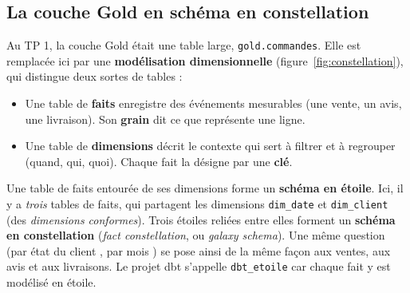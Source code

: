 \documentclass[11pt,a4paper]{article}
\newcommand{\cmd}[1]{\texttt{#1}}
\begin{document}
\subsection*{La couche Gold en schéma en constellation}

Au TP 1, la couche Gold était une table large, \cmd{gold.commandes}. Elle est remplacée ici par une
\textbf{modélisation dimensionnelle} (figure~\ref{fig:constellation}), qui distingue deux sortes de tables :

\begin{itemize}[leftmargin=*,itemsep=1pt]
\item Une table de \textbf{faits} enregistre des événements mesurables (une vente, un avis, une
  livraison). Son \textbf{grain} dit ce que représente une ligne.
\item Une table de \textbf{dimensions} décrit le contexte qui sert à filtrer et à regrouper (quand,
  qui, quoi). Chaque fait la désigne par une \textbf{clé}.
\end{itemize}

Une table de faits entourée de ses dimensions forme un \textbf{schéma en étoile}. Ici, il y a
\emph{trois} tables de faits, qui partagent les dimensions \cmd{dim\_date} et \cmd{dim\_client} (des
\emph{dimensions conformes}). Trois étoiles reliées entre elles forment un \textbf{schéma en
constellation} (\emph{fact constellation}, ou \emph{galaxy schema}). Une même question (\og par état
du client \fg{}, \og par mois \fg{}) se pose ainsi de la même façon aux ventes, aux avis et aux
livraisons. Le projet dbt s'appelle \cmd{dbt\_etoile} car chaque fait y est modélisé en étoile.
\end{document}
